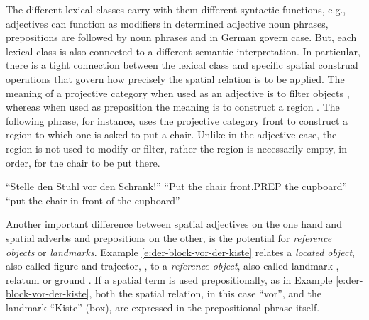 The different lexical classes carry with them different 
syntactic functions, e.g., adjectives can function as modifiers
in determined adjective noun phrases, prepositions are followed
by noun phrases and in German govern case.  
But, each lexical class is also connected 
to a different semantic interpretation. In particular, there is 
a tight connection between the lexical class and specific spatial 
construal operations that govern how precisely the spatial relation is
to be applied. The meaning
of a projective category when used as an adjective is to filter objects 
\citep{tenbrink2007space}, whereas when used as preposition the 
meaning is to construct a region \citep{klabunde1999logic}. 
The following phrase, for instance, uses the projective category
front to construct a region to which one is asked to put a chair. 
Unlike in the adjective case, the region is not used to modify
or filter, rather the region is necessarily empty, in order, for the chair to be put there. 

\begin{example}
\label{e:stelle-den-stuhl-vor-den-schrank}
\gll ``Stelle den Stuhl vor den Schrank!'' 
``Put the chair front.PREP the cupboard''
\glt ``put the chair in front of the cupboard''
\glend
\end{example}

Another important difference between spatial adjectives on the one 
hand and spatial adverbs and prepositions on the other, is the potential
for \emph{reference objects} or \emph{landmarks}. Example 
\ref{e:der-block-vor-der-kiste} relates a \emph{located object}, also called 
figure \citep{talmy2000toward2} and trajector, \citep{vandeloise1991spatial},
to a \emph{reference object}, also called landmark \citep{vandeloise1991spatial}, 
relatum \citep{tenbrink2007space} or ground \citep{talmy2000toward2}.
If a spatial term is used prepositionally, as in Example 
\ref{e:der-block-vor-der-kiste}, both the spatial relation, in this case 
``vor'', and the landmark ``Kiste'' (box), are expressed in the 
prepositional phrase itself. 

